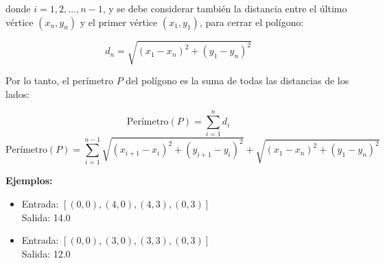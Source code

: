\begin{enumerate}
    donde \( i = 1, 2, \dots, n-1 \), y se debe considerar también la distancia entre el último vértice \( (x_n, y_n) \) y el primer vértice \( (x_1, y_1) \), para cerrar el polígono:
    
    \[
    d_n = \sqrt{(x_1 - x_n)^2 + (y_1 - y_n)^2}
    \]
    
    Por lo tanto, el perímetro \( P \) del polígono es la suma de todas las distancias de los lados:
    
    \[
    \text{Perímetro}(P) = \sum_{i=1}^{n} d_i 
    \]
    \[
    \text{Perímetro}(P) = \sum_{i=1}^{n-1} \sqrt{(x_{i+1} - x_i)^2 + (y_{i+1} - y_i)^2} + \sqrt{(x_1 - x_n)^2 + (y_1 - y_n)^2}
    \]
    
    \textbf{Ejemplos:}
    
    \begin{itemize}
        \item Entrada: \([ (0, 0), (4, 0), (4, 3), (0, 3) ]\) \\
        Salida: 14.0
        \item Entrada: \([ (0, 0), (3, 0), (3, 3), (0, 3) ]\) \\
        Salida: 12.0
    \end{itemize}

\end{enumerate}

\newpage
